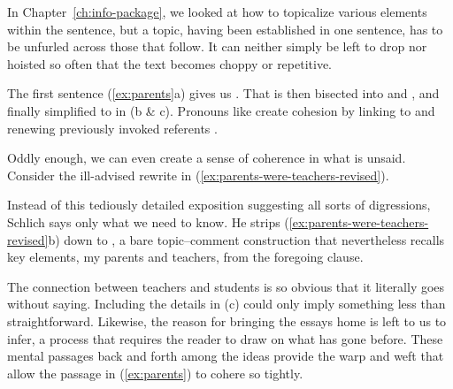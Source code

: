 In Chapter~\ref{ch:info-package}, we looked at how to topicalize various elements within the sentence, but a topic, having been established in one sentence, has to be unfurled across those that follow. It can neither simply be left to drop nor hoisted so often that the text becomes choppy or repetitive.

The first sentence (\ref{ex:parents}a) gives us . That  is then bisected into  and , and finally simplified to  in (b \& c). Pronouns like  create cohesion by linking to and renewing previously invoked referents \citep{HallidayHasan1976,BrownYule1983}.

Oddly enough, we can even create a sense of coherence in what is unsaid. Consider the ill-advised rewrite in (\ref{ex:parents-were-teachers-revised}).

\ea \label{ex:parents-were-teachers-revised}
    \z
\z
Instead of this tediously detailed exposition suggesting all sorts of digressions, Schlich says only what we need to know. He strips (\ref{ex:parents-were-teachers-revised}b) down to , a bare topic--comment construction that nevertheless recalls key elements, my parents and teachers, from the foregoing clause.

The connection between teachers and students is so obvious that it literally goes without saying. Including the details in (c) could only imply something less than straightforward. Likewise, the reason for bringing the essays home is left to us to infer, a process that requires the reader to draw on what has gone before. These mental passages back and forth among the ideas provide the warp and weft that allow the passage in (\ref{ex:parents}) to cohere so tightly.

\bigskip

